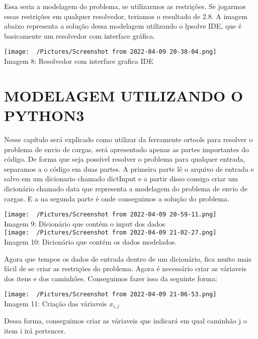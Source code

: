      Essa seria a modelagem do problema, se utilizarmos as restrições. Se jogarmos essas restrições em qualquer resolvedor, teriamos o resultado de 2.8. A imagem abaixo representa a solução dessa modelagem utilizando o lpsolve IDE, que é basicamente um resolvedor com interface gráfica.
      \begin{center}
        \texttt{[image: ~/Pictures/Screenshot from 2022-04-09 20-38-04.png]}\\
        Imagem 8: Resolvedor com interface grafica IDE
      \end{center}

\chapter{MODELAGEM UTILIZANDO O PYTHON3}
  Nesse capítulo será explicado como utilizar da ferramente ortools para resolver o problema de envio de cargas, será apresentado apenas as partes importantes do código.
  De forma que seja possível resolver o problema para qualquer entrada, separamos a o código em duas partes. A primeira parte lê o arquivo de entrada e salvo em um dicionario chamado dictInput e a partir disso consigo criar um dicionário chamado data que representa a modelagem do problema de envio de cargas. E a na segunda parte é onde conseguimos a solução do problema.
  \begin{center}
    \texttt{[image: ~/Pictures/Screenshot from 2022-04-09 20-59-11.png]}\\
    Imagem 9: Dicionário que contém o input dos dados\\
    \texttt{[image: ~/Pictures/Screenshot from 2022-04-09 21-02-27.png]}\\
    Imagem 10: Dicionário que contém os dados modelados.\\
  \end{center}

  Agora que tempos os dados de entrada dentro de um dicionário, fica muito mais fácil de se criar as restrições do problema. 
  Agora é necessário criar as váriaveis dos itens e dos caminhões. Conseguimos fazer isso da seguinte forma:
  \begin{center}
    \texttt{[image: ~/Pictures/Screenshot from 2022-04-09 21-06-53.png]}\\
    Imagem 11: Criação das váriaveis \(x_{i,j}\)
  \end{center}
  Dessa forma, conseguimos criar as váriaveis que indicará em qual caminhão j o item i irá pertencer.

